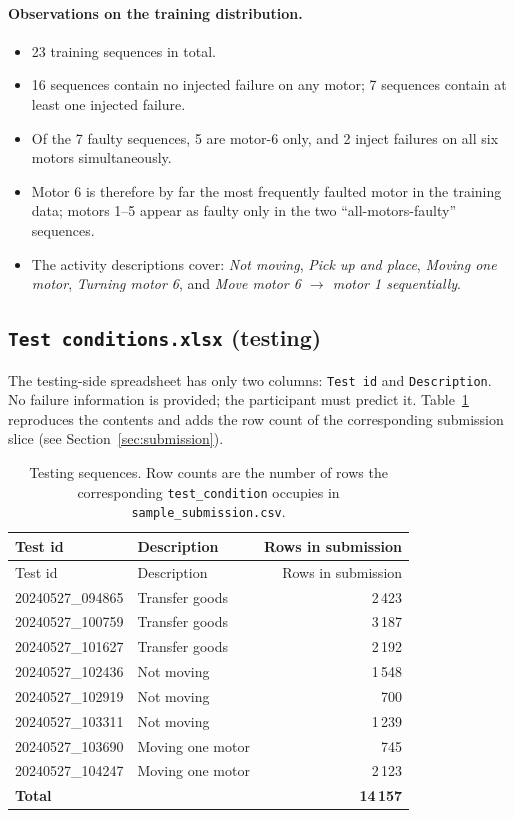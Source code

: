 \documentclass[11pt,a4paper]{article}
\begin{document}
\paragraph{Observations on the training distribution.}
\begin{itemize}[leftmargin=1.4em]
  \item 23 training sequences in total.
  \item 16 sequences contain no injected failure on any motor; 7 sequences
        contain at least one injected failure.
  \item Of the 7 faulty sequences, 5 are motor-6 only, and 2 inject failures
        on all six motors simultaneously.
  \item Motor 6 is therefore by far the most frequently faulted motor in the
        training data; motors 1--5 appear as faulty only in the two
        ``all-motors-faulty'' sequences.
  \item The activity descriptions cover: \emph{Not moving}, \emph{Pick up and
        place}, \emph{Moving one motor}, \emph{Turning motor 6}, and
        \emph{Move motor 6 $\to$ motor 1 sequentially}.
\end{itemize}

\subsection{\texttt{Test conditions.xlsx} (testing)}

The testing-side spreadsheet has only two columns: \texttt{Test id} and
\texttt{Description}. No failure information is provided; the participant must
predict it. Table~\ref{tab:test-conditions} reproduces the contents and adds
the row count of the corresponding submission slice (see
Section~\ref{sec:submission}).

\begin{longtable}{@{}llr@{}}
\caption{Testing sequences. Row counts are the number of rows the corresponding
\texttt{test\_condition} occupies in \texttt{sample\_submission.csv}.}
\label{tab:test-conditions}\\
\toprule
Test id & Description & Rows in submission \\
\midrule
\endfirsthead
\toprule
Test id & Description & Rows in submission \\
\midrule
\endhead
20240527\_094865 & Transfer goods    & 2\,423 \\
20240527\_100759 & Transfer goods    & 3\,187 \\
20240527\_101627 & Transfer goods    & 2\,192 \\
20240527\_102436 & Not moving        & 1\,548 \\
20240527\_102919 & Not moving        & 700   \\
20240527\_103311 & Not moving        & 1\,239 \\
20240527\_103690 & Moving one motor  & 745   \\
20240527\_104247 & Moving one motor  & 2\,123 \\
\midrule
\multicolumn{2}{l}{\textbf{Total}}   & \textbf{14\,157} \\
\bottomrule
\end{longtable}
\end{document}
